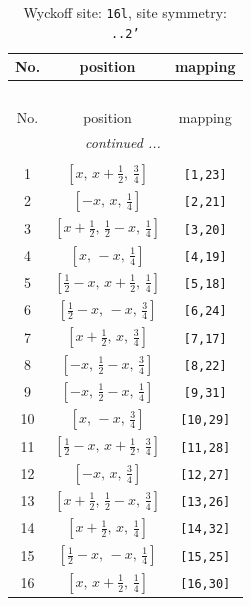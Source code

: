 \documentclass[fleqn,8pt]{jsarticle}
\begin{document}
\renewcommand{\arraystretch}{1.2}
\begin{longtable}{ccc}
\caption{Wyckoff site: {\tt 16l}, site symmetry: {\tt ..2'}}
 \\
 \hline \hline
No. & position & mapping \\ \hline \endfirsthead

\multicolumn{2}{l}{\tablename\ \thetable{}} \\
 \hline \hline
No. & position & mapping \\ \hline \endhead

 \hline \hline
\multicolumn{2}{r}{\footnotesize\it continued ...} \\ \endfoot

 \hline \hline
\multicolumn{2}{r}{} \\ \endlastfoot

1 & $\left[ x,\, x + \frac{1}{2},\, \frac{3}{4} \right]$ & {\tt [1,23]} \\ \hline
2 & $\left[ - x,\, x,\, \frac{1}{4} \right]$ & {\tt [2,21]} \\ \hline
3 & $\left[ x + \frac{1}{2},\, \frac{1}{2} - x,\, \frac{1}{4} \right]$ & {\tt [3,20]} \\ \hline
4 & $\left[ x,\, - x,\, \frac{1}{4} \right]$ & {\tt [4,19]} \\ \hline
5 & $\left[ \frac{1}{2} - x,\, x + \frac{1}{2},\, \frac{1}{4} \right]$ & {\tt [5,18]} \\ \hline
6 & $\left[ \frac{1}{2} - x,\, - x,\, \frac{3}{4} \right]$ & {\tt [6,24]} \\ \hline
7 & $\left[ x + \frac{1}{2},\, x,\, \frac{3}{4} \right]$ & {\tt [7,17]} \\ \hline
8 & $\left[ - x,\, \frac{1}{2} - x,\, \frac{3}{4} \right]$ & {\tt [8,22]} \\ \hline
9 & $\left[ - x,\, \frac{1}{2} - x,\, \frac{1}{4} \right]$ & {\tt [9,31]} \\ \hline
10 & $\left[ x,\, - x,\, \frac{3}{4} \right]$ & {\tt [10,29]} \\ \hline
11 & $\left[ \frac{1}{2} - x,\, x + \frac{1}{2},\, \frac{3}{4} \right]$ & {\tt [11,28]} \\ \hline
12 & $\left[ - x,\, x,\, \frac{3}{4} \right]$ & {\tt [12,27]} \\ \hline
13 & $\left[ x + \frac{1}{2},\, \frac{1}{2} - x,\, \frac{3}{4} \right]$ & {\tt [13,26]} \\ \hline
14 & $\left[ x + \frac{1}{2},\, x,\, \frac{1}{4} \right]$ & {\tt [14,32]} \\ \hline
15 & $\left[ \frac{1}{2} - x,\, - x,\, \frac{1}{4} \right]$ & {\tt [15,25]} \\ \hline
16 & $\left[ x,\, x + \frac{1}{2},\, \frac{1}{4} \right]$ & {\tt [16,30]} \\
\end{longtable}
\end{document}

